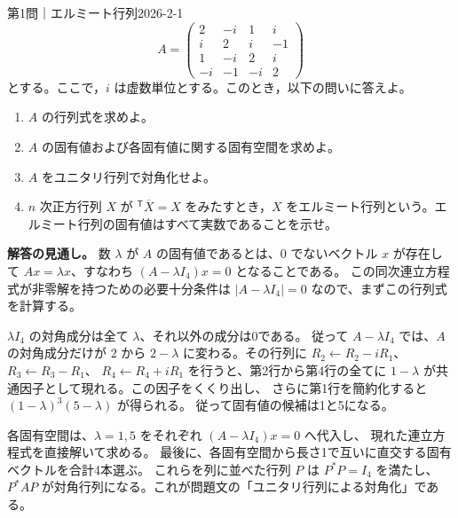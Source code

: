 \begin{problem}{第1問｜エルミート行列}{2026-2-1}
\[
A=\begin{pmatrix}
2&-i&1&i\\ i&2&i&-1\\ 1&-i&2&i\\ -i&-1&-i&2
\end{pmatrix}
\]
とする。ここで，$i$ は虚数単位とする。このとき，以下の問いに答えよ。
\begin{enumerate}
  \item[(1)] $A$ の行列式を求めよ。
  \item[(2)] $A$ の固有値および各固有値に関する固有空間を求めよ。
  \item[(3)] $A$ をユニタリ行列で対角化せよ。
  \item[(4)] $n$ 次正方行列 $X$ が ${}^{\mathsf T}\overline X=X$ をみたすとき，$X$ をエルミート行列という。エルミート行列の固有値はすべて実数であることを示せ。
\end{enumerate}
\end{problem}
\begin{memo*}
\textbf{解答の見通し。}
数 $\lambda$ が $A$ の固有値であるとは、$0$ でないベクトル $x$ が存在して
$Ax=\lambda x$、すなわち $(A-\lambda I_4)x=0$ となることである。
この同次連立方程式が非零解を持つための必要十分条件は
$|A-\lambda I_4|=0$ なので、まずこの行列式を計算する。

$\lambda I_4$ の対角成分は全て $\lambda$、それ以外の成分は0である。
従って $A-\lambda I_4$ では、$A$ の対角成分だけが
$2$ から $2-\lambda$ に変わる。その行列に
$R_2\leftarrow R_2-iR_1$、$R_3\leftarrow R_3-R_1$、
$R_4\leftarrow R_4+iR_1$ を行うと、第2行から第4行の全てに
$1-\lambda$ が共通因子として現れる。この因子をくくり出し、
さらに第1行を簡約化すると $(1-\lambda)^3(5-\lambda)$ が得られる。
従って固有値の候補は1と5になる。

各固有空間は、$\lambda=1,5$ をそれぞれ $(A-\lambda I_4)x=0$ へ代入し、
現れた連立方程式を直接解いて求める。
最後に、各固有空間から長さ1で互いに直交する固有ベクトルを合計4本選ぶ。
これらを列に並べた行列 $P$ は $P^*P=I_4$ を満たし、
$P^*AP$ が対角行列になる。これが問題文の「ユニタリ行列による対角化」である。
\end{memo*}
